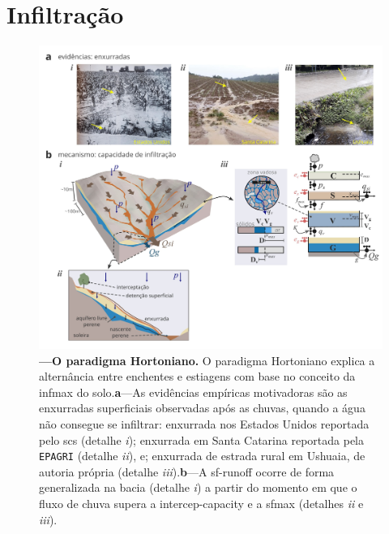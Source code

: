 \documentclass[./main.tex]{subfiles}
\begin{document}
\section{Infiltração} \label{sec:hydro:mechs}

\begin{figure}[t!] 
\centering				
\includegraphics[width=0.98\linewidth]{figs/fig_horton.jpg}		
\caption[O \gls{paradigma} Hortoniano]
{
\textbf{---\;O \gls{paradigma} Hortoniano.} O \gls{paradigma} Hortoniano explica a alternância entre enchentes e estiagens com base no conceito da \gls{infmax} do solo.\;\textbf{a}\;---\;As evidências empíricas motivadoras são as enxurradas superficiais observadas após as chuvas, quando a água não consegue se infiltrar: enxurrada nos Estados Unidos reportada pelo \acrshort{scs} \cite{strahler1986} (detalhe \textrm{\textit{i}}); enxurrada em Santa Catarina reportada pela \texttt{EPAGRI} \cite{epagri2024} (detalhe \textrm{\textit{ii}}), e; enxurrada de estrada rural em Ushuaia, de autoria própria (detalhe \textrm{\textit{iii}}).\;\textbf{b}\;---\;A \gls{sf-runoff} ocorre de forma generalizada na bacia (detalhe \textrm{\textit{i}}) a partir do momento em que o fluxo de chuva supera a \gls{intercep-capacity} e a \gls{sfmax} (detalhes \textrm{\textit{ii}} e \textrm{\textit{iii}}).
}
\label{fig:hydro:horton} 		
\end{figure}
\end{document}
